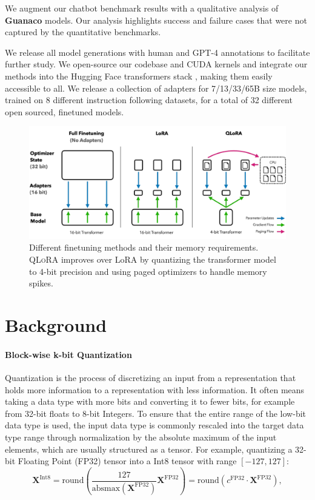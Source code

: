 \documentclass{article}
\newcommand{\method}{\textsc{QLoRA}\xspace}
\newcommand{\bfmodel}{\textbf{Guanaco}\xspace}
\newcommand{\pagedoptim}{paged optimizers\xspace}
\begin{document}
We augment our chatbot benchmark results with a qualitative analysis of \bfmodel models. Our analysis highlights success and failure cases that were not captured by the quantitative benchmarks.

We release all model generations with human and GPT-4 annotations to facilitate further study. We open-source our codebase and CUDA kernels and integrate our methods into the Hugging Face transformers stack \citep{wolf2019huggingface}, making them easily accessible to all. We release a collection of adapters for 7/13/33/65B size models, trained on 8 different instruction following datasets, for a total of 32 different open sourced, finetuned models.


\begin{figure}[t]
     \centering
         \includegraphics[scale=0.67]{figures/qlora.pdf}
        \caption{Different finetuning methods and their memory requirements. \method improves over LoRA by quantizing the transformer model to 4-bit precision and using \pagedoptim to handle memory spikes. 
        }
        \label{fig:qlora}
\end{figure} 

\section{Background}
\paragraph{Block-wise k-bit Quantization} Quantization is the process of discretizing an input from a representation that holds more information to a representation with less information. It often means taking a data type with more bits and converting it to fewer bits, for example from 32-bit floats to 8-bit Integers. To ensure that the entire range of the low-bit data type is used, the input data type is commonly rescaled into the target data type range through normalization by the absolute maximum of the input elements, which are usually structured as a tensor. For example, quantizing a 32-bit Floating Point (FP32) tensor into a Int8 tensor with range $[-127, 127]$:
\begin{equation}
    \mathbf{X}^{ \text{Int8}} = \text{round}\left( \frac{127}{{\text{absmax}}(\mathbf{X}^{{\text{FP32}}})}\mathbf{X}^{{\text{FP32}}} \right) = \text{round}(c^{\text{FP32}}\cdot \mathbf{X}^{{\text{FP32}}}),
\end{equation}
\end{document}
